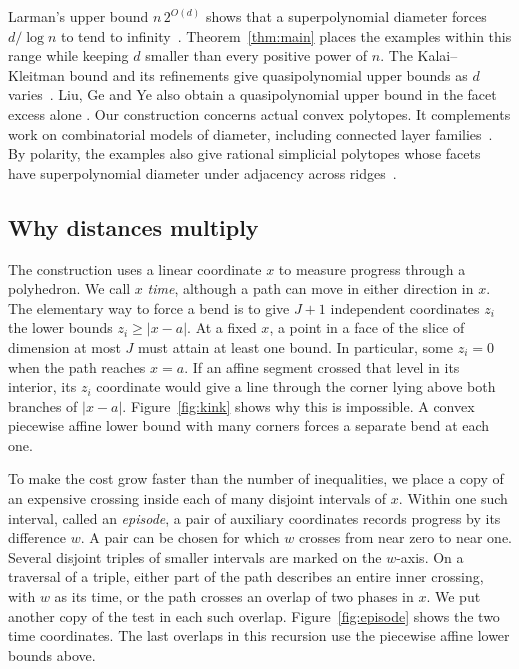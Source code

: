 Larman's upper bound \(n\,2^{O(d)}\) shows that a superpolynomial
diameter forces \(d/\log n\) to tend to infinity~\cite{larman}.
Theorem~\ref{thm:main} places the examples within this range while
keeping \(d\) smaller than every positive power of \(n\).
The Kalai--Kleitman bound and its refinements give quasipolynomial upper
bounds as \(d\) varies~\cite{kalai,todd,sukegawa}. Liu, Ge and Ye
also obtain a quasipolynomial upper bound in the facet excess alone
\cite{liugeye}. Our construction concerns actual convex polytopes.
It complements work on combinatorial models of diameter, including
connected layer families~\cite{abstraction}. By polarity, the examples
also give rational simplicial polytopes whose facets have superpolynomial
diameter under adjacency across ridges~\cite{ziegler}.

\subsection{Why distances multiply}

The construction uses a linear coordinate \(x\) to measure progress through
a polyhedron. We call \(x\) \emph{time}, although a path can move in either
direction in \(x\). The elementary way to force a bend is to give
\(J+1\) independent coordinates \(z_i\) the lower bounds
\(z_i\ge |x-a|\). At a fixed \(x\), a point in a face of the slice of
dimension at most \(J\) must attain at least one bound. In particular,
some \(z_i=0\) when the path reaches \(x=a\). If an affine segment
crossed that level in its interior, its \(z_i\) coordinate would give a
line through the corner lying above both branches of \(|x-a|\).
Figure~\ref{fig:kink} shows why this is impossible. A convex piecewise
affine lower bound with many corners forces a separate bend at each one.



To make the cost grow faster than the number of inequalities, we place
a copy of an expensive crossing inside each of many disjoint intervals
of \(x\). Within one such interval, called an \emph{episode}, a pair
of auxiliary coordinates records progress by its difference \(w\).
A pair can be chosen for which \(w\) crosses from near zero to near one.
Several disjoint triples of smaller intervals are marked on the \(w\)-axis.
On a traversal of a triple, either part of the path describes an entire
inner crossing, with \(w\) as its time, or the path crosses an overlap
of two phases in \(x\). We put another copy of the test in each such
overlap. Figure~\ref{fig:episode} shows the two time coordinates.
The last overlaps in this recursion use the piecewise affine lower
bounds above.

